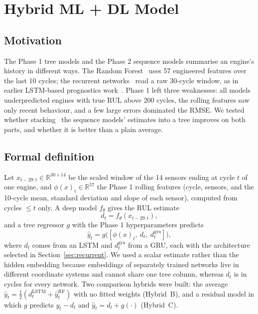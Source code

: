\section{Hybrid ML + DL Model}
\label{sec:hybrid}

\subsection{Motivation}
The Phase 1 tree models and the Phase 2 sequence models summarise an engine's history in different ways. The Random Forest~\cite{breiman_2001_random} uses 57 engineered features over the last 10 cycles; the recurrent networks~\cite{hochreiter_1997_lstm,cho_2014_gru} read a raw 30-cycle window, as in earlier LSTM-based prognostics work~\cite{zheng_2017_lstm}. Phase 1 left three weaknesses: all models underpredicted engines with true RUL above 200 cycles, the rolling features saw only recent behaviour, and a few large errors dominated the RMSE. We tested whether stacking~\cite{wolpert_1992_stacked} the sequence models' estimates into a tree improves on both parts, and whether it is better than a plain average.

\subsection{Formal definition}
Let $x_{t-29:t}\in\mathbb{R}^{30\times14}$ be the scaled window of the 14 sensors ending at cycle $t$ of one engine, and $\phi(x)_t\in\mathbb{R}^{57}$ the Phase 1 rolling features (cycle, sensors, and the 10-cycle mean, standard deviation and slope of each sensor), computed from cycles $\le t$ only. A deep model $f_\theta$ gives the RUL estimate
\begin{equation}
d_t=f_\theta(x_{t-29:t}),
\end{equation}
and a tree regressor $g$ with the Phase 1 hyperparameters predicts
\begin{equation}
\hat y_t=g\big([\phi(x)_t,\ d_t,\ d^{\mathrm{gru}}_t]\big),
\end{equation}
where $d_t$ comes from an LSTM and $d^{\mathrm{gru}}_t$ from a GRU, each with the architecture selected in Section~\ref{sec:recurrent}. We used a scalar estimate rather than the hidden embedding because embeddings of separately trained networks live in different coordinate systems and cannot share one tree column, whereas $d_t$ is in cycles for every network. Two comparison hybrids were built: the average $\hat y_t=\tfrac12(d^{\mathrm{LSTM}}_t+\hat y^{\mathrm{RF}}_t)$ with no fitted weights (Hybrid~B), and a residual model in which $g$ predicts $y_t-d_t$ and $\hat y_t=d_t+g(\cdot)$ (Hybrid~C).

